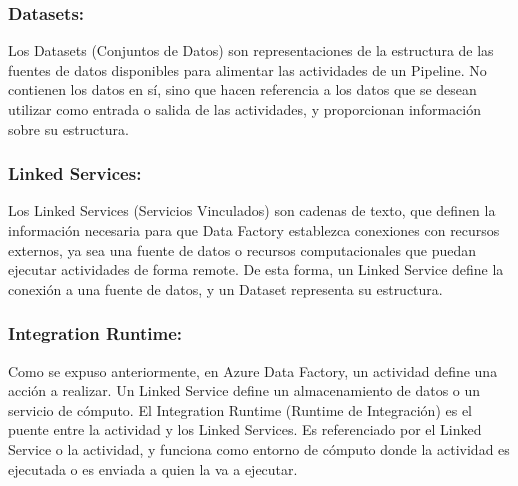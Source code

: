 \subsubsection{Datasets:}

Los Datasets (Conjuntos de Datos) son representaciones de la estructura de las fuentes de datos disponibles para 
alimentar las actividades de un Pipeline. No contienen los datos en sí, sino que hacen referencia a los datos que se 
desean utilizar como entrada o salida de las actividades, y proporcionan información sobre su estructura.

\subsubsection{Linked Services:}

Los Linked Services (Servicios Vinculados) son cadenas de texto, que definen la información necesaria 
para que Data Factory establezca conexiones con recursos externos, ya sea una fuente de datos o recursos computacionales 
que puedan ejecutar actividades de forma remote. De esta forma, un Linked Service define la conexión a una fuente de 
datos, y un Dataset representa su estructura.

\subsubsection{Integration Runtime:}

Como se expuso anteriormente, en Azure Data Factory, un actividad define una acci\'on a realizar. Un Linked Service define 
un almacenamiento de datos o un servicio de c\'omputo. El Integration Runtime (Runtime de Integraci\'on) es el 
puente entre la actividad y los Linked Services. 
Es referenciado por el Linked Service o la actividad, y funciona como entorno de cómputo donde la actividad es ejecutada 
o es enviada a quien la va a ejecutar. 